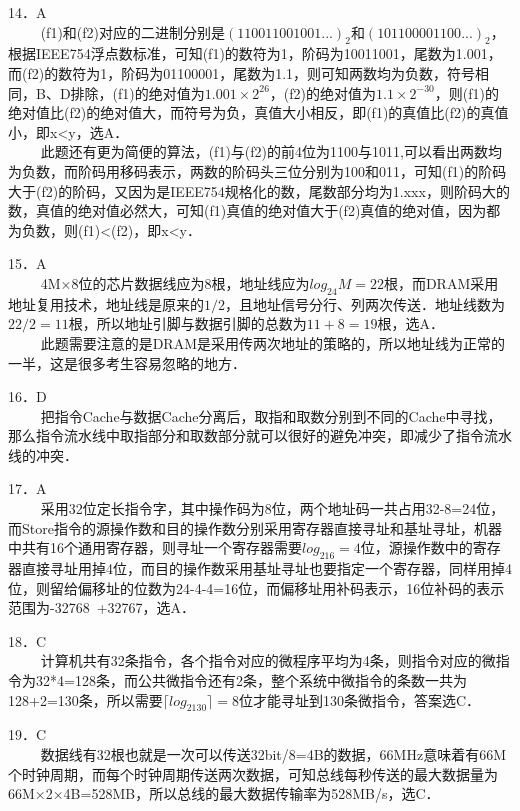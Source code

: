 14．A \\
$\qquad$ (f1)和(f2)对应的二进制分别是$(110011001001...)_2$和$(101100001100...)_2$，根据IEEE754浮点数标准，可知(f1)的数符为1，阶码为10011001，尾数为1.001，而(f2)的数符为1，阶码为01100001，尾数为1.1，则可知两数均为负数，符号相同，B、D排除，(f1)的绝对值为$1.001\times2^{26}$，(f2)的绝对值为$1.1\times2^{-30}$，则(f1)的绝对值比(f2)的绝对值大，而符号为负，真值大小相反，即(f1)的真值比(f2)的真值小，即x<y，选A． \\
$\qquad$ 此题还有更为简便的算法，(f1)与(f2)的前4位为1100与1011,可以看出两数均为负数，而阶码用移码表示，两数的阶码头三位分别为100和011，可知(f1)的阶码大于(f2)的阶码，又因为是IEEE754规格化的数，尾数部分均为1.xxx，则阶码大的数，真值的绝对值必然大，可知(f1)真值的绝对值大于(f2)真值的绝对值，因为都为负数，则(f1)<(f2)，即x<y．

15．A \\
$\qquad$ 4M×8位的芯片数据线应为8根，地址线应为$log_24M=22$根，而DRAM采用地址复用技术，地址线是原来的$1/2$，且地址信号分行、列两次传送．地址线数为$22/2=11$根，所以地址引脚与数据引脚的总数为$11+8=19$根，选A． \\
$\qquad$ 此题需要注意的是DRAM是采用传两次地址的策略的，所以地址线为正常的一半，这是很多考生容易忽略的地方．

16．D \\
$\qquad$ 把指令Cache与数据Cache分离后，取指和取数分别到不同的Cache中寻找，那么指令流水线中取指部分和取数部分就可以很好的避免冲突，即减少了指令流水线的冲突．

17．A \\
$\qquad$ 采用32位定长指令字，其中操作码为8位，两个地址码一共占用32-8=24位，而Store指令的源操作数和目的操作数分别采用寄存器直接寻址和基址寻址，机器中共有16个通用寄存器，则寻址一个寄存器需要$log_216=4$位，源操作数中的寄存器直接寻址用掉4位，而目的操作数采用基址寻址也要指定一个寄存器，同样用掉4位，则留给偏移址的位数为24-4-4=16位，而偏移址用补码表示，16位补码的表示范围为-32768~+32767，选A．

18．C \\
$\qquad$ 计算机共有32条指令，各个指令对应的微程序平均为4条，则指令对应的微指令为32*4=128条，而公共微指令还有2条，整个系统中微指令的条数一共为128+2=130条，所以需要$\lceil log_2130 \rceil =8$位才能寻址到130条微指令，答案选C．

19．C \\
$\qquad$ 数据线有32根也就是一次可以传送32bit/8=4B的数据，66MHz意味着有66M个时钟周期，而每个时钟周期传送两次数据，可知总线每秒传送的最大数据量为66M×2×4B=528MB，所以总线的最大数据传输率为528MB/s，选C．

